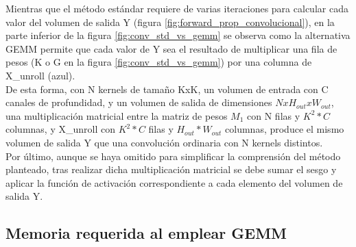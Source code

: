 Mientras que el método estándar requiere de varias iteraciones para calcular cada valor del volumen de salida Y (figura \ref{fig:forward_prop_convolucional}), en la parte inferior de la figura \ref{fig:conv_std_vs_gemm} se observa como la alternativa GEMM permite que cada valor de Y sea el resultado de multiplicar una fila de pesos (K o G en la figura \ref{fig:conv_std_vs_gemm}) por una columna de X\_unroll (azul). \cite{Programming_Massively} \\
De esta forma, con N kernels de tamaño KxK, un volumen de entrada con C canales de profundidad, y un volumen de salida de dimensiones $NxH_{out}xW_{out}$, una multiplicación matricial entre la matriz de pesos $M_1$ con N filas y $K^2*C$ columnas, y X\_unroll con $K^2*C$ filas y $H_{out}*W_{out}$ columnas, produce el mismo volumen de salida Y que una convolución ordinaria con N kernels distintos. \\
Por último, aunque se haya omitido para simplificar la comprensión del método planteado, tras realizar dicha multiplicación matricial se debe sumar el sesgo y aplicar la función de activación correspondiente a cada elemento del volumen de salida Y.

\subsection{Memoria requerida al emplear GEMM}

